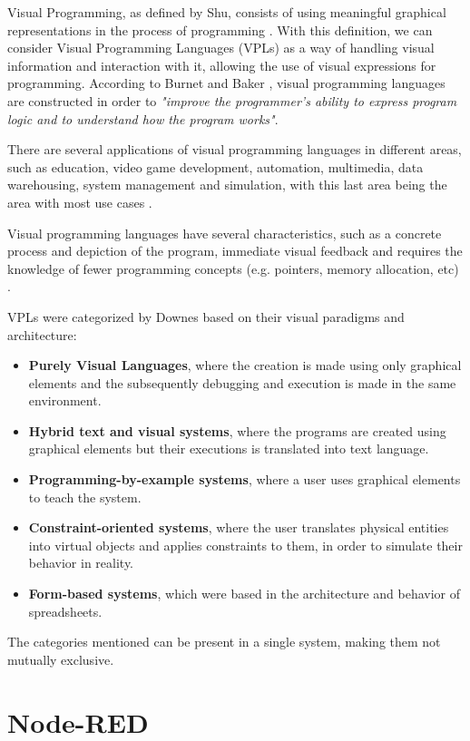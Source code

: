 Visual Programming, as defined by Shu, consists of using meaningful graphical representations in the process of programming \cite{vpl_definition_shu}. With this definition, we can consider Visual Programming Languages (VPLs) as a way of handling visual information and interaction with it, allowing the use of visual expressions for programming. According to Burnet and Baker \cite{scaling_vpls}, visual programming languages are constructed in order to \emph{"improve the programmer's ability to express program logic and to understand how the program works"}.
\par There are several applications of visual programming languages in different areas, such as education, video game development, automation, multimedia, data warehousing, system management and simulation, with this last area being the area with most use cases \cite{survey_vpl_iot}.
\par Visual programming languages have several characteristics, such as a concrete process and depiction of the program, immediate visual feedback and requires the knowledge of fewer programming concepts (e.g. pointers, memory allocation, etc) \cite{scaling_vpls}.
\par VPLs were categorized by Downes \cite{vpls_survey} based on their visual paradigms and architecture: 
\begin{itemize}
    \item \textbf{Purely Visual Languages}, where the creation is made using only graphical elements and the subsequently debugging and execution is made in the same environment.
    \item \textbf{Hybrid text and visual systems}, where the programs are created using graphical elements but their executions is translated into text language.
    \item \textbf{Programming-by-example systems}, where a user uses graphical elements to teach the system.
    \item \textbf{Constraint-oriented systems}, where the user translates physical entities into virtual objects and applies constraints to them, in order to simulate their behavior in reality.
    \item \textbf{Form-based systems}, which were based in the architecture and behavior of spreadsheets.
\end{itemize}
The categories mentioned can be present in a single system, making them not mutually exclusive.

\section{Node-RED}\label{sec:node-red}

